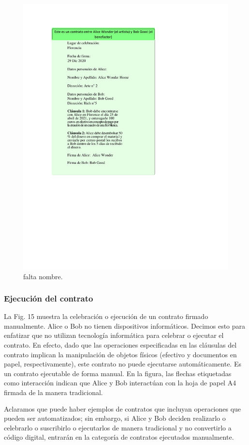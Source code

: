\documentclass[12pt]{report} %
\begin{document}
\begin{itemize}
\begin{figure}
\centering
\includegraphics[width=0.85\columnwidth]{imagenes/ejcontfirmman.pdf}
\caption{falta nombre.}
\label{ejcontfirmman.pdf}
\end{figure} 

\subsubsection{Ejecución del contrato}

La Fig. 15 muestra la celebración o ejecución de un contrato firmado manualmente. Alice o Bob no tienen dispositivos informáticos. Decimos esto para enfatizar que no utilizan tecnología informática para celebrar o ejecutar el contrato. En efecto, dado que las operaciones especificadas en las cláusulas del contrato implican la manipulación de objetos físicos (efectivo y documentos en papel, respectivamente), este contrato no puede ejecutarse automáticamente. Es un contrato ejecutable de forma manual. En la figura, las flechas etiquetadas como interacción indican que Alice y Bob interactúan con la hoja de papel A4 firmada de la manera tradicional.

Aclaramos que puede haber ejemplos de contratos que incluyan operaciones que pueden ser automatizados; sin embargo, si Alice y Bob deciden realizarlo o celebrarlo o suscribirlo o ejecutarlos de manera tradicional y no convertirlo a código digital, entrarán en la categoría de contratos ejecutados manualmente.



\end{itemize}
\end{document}
